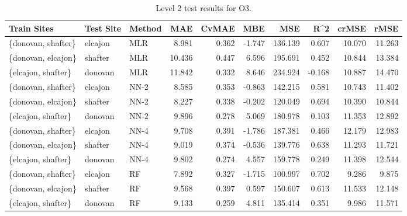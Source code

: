 \begin{table}[h]
\begin{tabular}{lllrrrrrrr}
\toprule
 Train Sites & Test Site & Method &   MAE &  CvMAE &       MBE &     MSE &   R\textasciicircum2 &  crMSE &   rMSE \\
\midrule
\{donovan, shafter\} & elcajon & MLR & 8.981 & 0.362 & -1.747 & 136.139 & 0.607 & 10.070 & 11.263\\
\{donovan, elcajon\} & shafter & MLR & 10.436 & 0.447 & 6.596 & 195.691 & 0.452 & 10.844 & 13.384\\
\{elcajon, shafter\} & donovan & MLR & 11.842 & 0.332 & 8.646 & 234.924 & -0.168 & 10.887 & 14.470\\
\{donovan, shafter\} & elcajon & NN-2 & 8.585 & 0.353 & -0.863 & 142.215 & 0.581 & 10.743 & 11.402\\
\{donovan, elcajon\} & shafter & NN-2 & 8.227 & 0.338 & -0.202 & 120.049 & 0.694 & 10.390 & 10.844\\
\{elcajon, shafter\} & donovan & NN-2 & 9.896 & 0.278 & 5.069 & 180.978 & 0.103 & 11.353 & 12.892\\
\{donovan, shafter\} & elcajon & NN-4 & 9.708 & 0.391 & -1.786 & 187.381 & 0.466 & 12.179 & 12.983\\
\{donovan, elcajon\} & shafter & NN-4 & 9.019 & 0.374 & -0.536 & 139.776 & 0.638 & 11.293 & 11.721\\
\{elcajon, shafter\} & donovan & NN-4 & 9.802 & 0.274 & 4.557 & 159.778 & 0.249 & 11.398 & 12.544\\
\{donovan, shafter\} & elcajon & RF & 7.892 & 0.327 & -1.715 & 100.997 & 0.702 & 9.286 & 9.875\\
\{donovan, elcajon\} & shafter & RF & 9.568 & 0.397 & 0.597 & 150.607 & 0.613 & 11.533 & 12.148\\
\{elcajon, shafter\} & donovan & RF & 9.133 & 0.259 & 4.811 & 135.414 & 0.351 & 9.986 & 11.571\\
\bottomrule
\end{tabular}
\caption{Level 2 test results for O3.}
\end{table}
